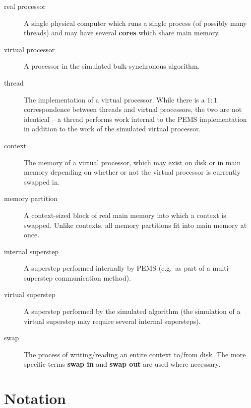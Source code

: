 \documentclass[12pt]{carletoncsthesis}
\begin{document}
\begin{description}
\item[real processor] A single physical computer which runs a single process
(of possibly many threads) and may have several \textbf{cores} which share
main memory.

\item[virtual processor] A processor in the simulated bulk-synchronous
algorithm.

\item[thread] The implementation of a virtual processor.  While there is
a $1:1$ correspondence between threads and virtual processors, the two are
not identical -- a thread performs work internal to the PEMS implementation
in addition to the work of the simulated virtual processor.

\item[context] The memory of a virtual processor, which may exist on
disk or in main memory depending on whether or not the virtual processor
is currently swapped in.

\item[memory partition] A context-sized block of real main memory into
which a context is swapped.  Unlike contexts, all memory partitions fit into
main memory at once.

\item[internal superstep] A superstep performed internally by PEMS
(e.g.\ as part of a multi-superstep communication method).

\item[virtual superstep] A superstep performed by the simulated algorithm (the
simulation of a virtual superstep may require several internal supersteps).

\item[swap] The process of writing/reading an entire context to/from disk.
The more specific terms \textbf{swap in} and \textbf{swap out} are used
where necessary.
\end{description}

\section{Notation}
\label{notation}
\end{document}
